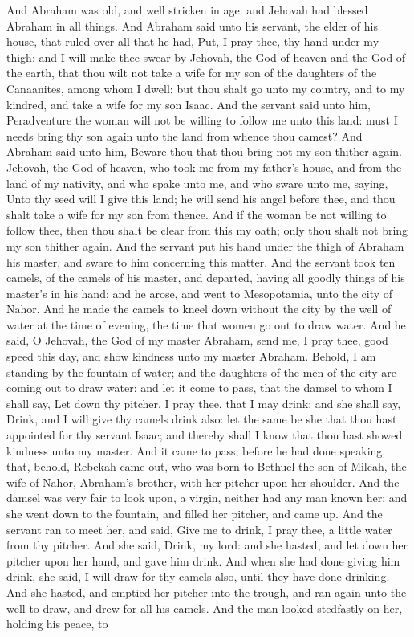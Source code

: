 And Abraham was old, and well stricken in age: and Jehovah had blessed Abraham in all things. And Abraham said unto his servant, the elder of his house, that ruled over all that he had, Put, I pray thee, thy hand under my thigh: and I will make thee swear by Jehovah, the God of heaven and the God of the earth, that thou wilt not take a wife for my son of the daughters of the Canaanites, among whom I dwell: but thou shalt go unto my country, and to my kindred, and take a wife for my son Isaac. And the servant said unto him, Peradventure the woman will not be willing to follow me unto this land: must I needs bring thy son again unto the land from whence thou camest? And Abraham said unto him, Beware thou that thou bring not my son thither again. Jehovah, the God of heaven, who took me from my father’s house, and from the land of my nativity, and who spake unto me, and who sware unto me, saying, Unto thy seed will I give this land; he will send his angel before thee, and thou shalt take a wife for my son from thence. And if the woman be not willing to follow thee, then thou shalt be clear from this my oath; only thou shalt not bring my son thither again. And the servant put his hand under the thigh of Abraham his master, and sware to him concerning this matter.  And the servant took ten camels, of the camels of his master, and departed, having all goodly things of his master’s in his hand: and he arose, and went to Mesopotamia, unto the city of Nahor. And he made the camels to kneel down without the city by the well of water at the time of evening, the time that women go out to draw water. And he said, O Jehovah, the God of my master Abraham, send me, I pray thee, good speed this day, and show kindness unto my master Abraham. Behold, I am standing by the fountain of water; and the daughters of the men of the city are coming out to draw water: and let it come to pass, that the damsel to whom I shall say, Let down thy pitcher, I pray thee, that I may drink; and she shall say, Drink, and I will give thy camels drink also: let the same be she that thou hast appointed for thy servant Isaac; and thereby shall I know that thou hast showed kindness unto my master. And it came to pass, before he had done speaking, that, behold, Rebekah came out, who was born to Bethuel the son of Milcah, the wife of Nahor, Abraham’s brother, with her pitcher upon her shoulder. And the damsel was very fair to look upon, a virgin, neither had any man known her: and she went down to the fountain, and filled her pitcher, and came up. And the servant ran to meet her, and said, Give me to drink, I pray thee, a little water from thy pitcher. And she said, Drink, my lord: and she hasted, and let down her pitcher upon her hand, and gave him drink. And when she had done giving him drink, she said, I will draw for thy camels also, until they have done drinking. And she hasted, and emptied her pitcher into the trough, and ran again unto the well to draw, and drew for all his camels. And the man looked stedfastly on her, holding his peace, to 